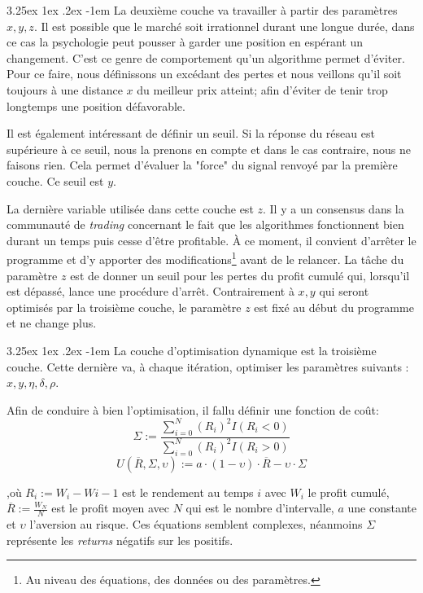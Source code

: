 \documentclass[a4paper, 11pt]{article}
\makeatletter
\renewcommand\paragraph{\@startsection{paragraph}{5}{\z@}%
  {3.25ex \@plus1ex \@minus.2ex}%
  {-1em}%
  {\normalfont\normalsize\bfseries}}
\makeatother
\begin{document}
\paragraph{}
La deuxième couche va travailler à partir des paramètres $x,y,z$. Il est possible que le marché soit irrationnel durant une longue
durée, dans ce cas la psychologie peut pousser à garder une position en espérant un changement. C'est ce genre de comportement qu'un
algorithme permet d'éviter. Pour ce faire, nous définissons un excédant des pertes et nous veillons qu'il soit toujours à une distance
$x$ du meilleur prix atteint; afin d'éviter de tenir trop longtemps une position défavorable.

Il est également intéressant de définir un seuil. Si la réponse du réseau est supérieure à ce seuil, nous la prenons en compte et
dans le cas contraire, nous ne faisons rien. Cela permet d'évaluer la "force" du signal renvoyé par la première couche. Ce seuil
est $y$.

La dernière variable utilisée dans cette couche est $z$. Il y a un consensus dans la communauté de \textit{trading} concernant le fait
que les algorithmes fonctionnent bien durant un temps puis cesse d'être profitable. À ce moment, il convient d'arrêter le programme
et d'y apporter des modifications\footnote{Au niveau des équations, des données ou des paramètres.} avant de le relancer. La tâche du
paramètre $z$ est de donner un seuil pour les pertes du profit cumulé qui, lorsqu'il est dépassé, lance une procédure d'arrêt.
Contrairement à $x,y$ qui seront optimisés par la troisième couche, le paramètre $z$ est fixé au début du programme et ne change plus.

\paragraph{}
La couche d'optimisation dynamique est la troisième couche. Cette dernière va, à chaque itération, optimiser les paramètres suivants :
$x,y,\eta,\delta,\rho$.

Afin de conduire à bien l'optimisation, il fallu définir une fonction de coût\cite{fx_trading}:
$$\Sigma := \frac{\sum_{i=0}^N (R_i)^2 I(R_i < 0)}{\sum_{i=0}^N (R_i)^2 I(R_i > 0)}$$
$$ U(\overline{R},\Sigma,\upsilon) := a\cdot(1-\upsilon)\cdot \overline{R} - \upsilon \cdot \Sigma$$

,où $R_i := W_i - W{i-1}$ est le rendement au temps $i$ avec $W_i$ le profit cumulé, $\overline{R} := \frac{W_N}{N}$ est le profit moyen
avec $N$ qui est le nombre d'intervalle, $a$ une constante et $\upsilon$ l'aversion au risque.
Ces équations semblent complexes, néanmoins $\Sigma$ représente les \textit{returns} négatifs sur les positifs.
\end{document}
